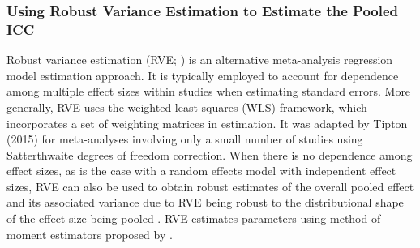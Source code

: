 

  
\subsubsection{Using Robust Variance Estimation to Estimate the Pooled ICC} 
Robust variance estimation (RVE; \cite{hedges2010}) is an alternative meta-analysis regression model estimation approach. It is typically employed to account for dependence among multiple effect sizes within studies when estimating standard errors. More generally, RVE uses the weighted least squares (WLS) framework, which incorporates a set of weighting matrices in estimation. It was adapted by Tipton (2015) for meta-analyses involving only a small number of studies using Satterthwaite degrees of freedom correction. When there is no dependence among effect sizes, as is the case with a random effects model with independent effect sizes,  RVE can also be used to obtain robust estimates of the overall pooled effect and its associated variance due to RVE being robust to the distributional shape of the effect size being pooled \cite{hedges2010}. RVE estimates parameters using method-of-moment estimators proposed by .

